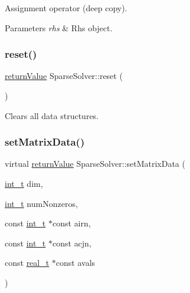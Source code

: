 Assignment operator (deep copy). 
\begin{DoxyParams}{Parameters}
{\em rhs} & Rhs object. \\
\hline
\end{DoxyParams}
\mbox{\label{class_sparse_solver_a917d966b021d7d116780d3cec3a196d8}} 
\subsubsection{\texorpdfstring{reset()}{reset()}}
{\footnotesize\ttfamily \hyperlink{_message_handling_8hpp_a81d556f613bfbabd0b1f9488c0fa865e}{return\+Value} Sparse\+Solver\+::reset (\begin{DoxyParamCaption}{ }\end{DoxyParamCaption})\hspace{0.3cm}{\ttfamily [virtual]}}

Clears all data structures. \mbox{\label{class_sparse_solver_a875146c92fbf3ea67cfc17233ba391e9}} 
\subsubsection{\texorpdfstring{set\+Matrix\+Data()}{setMatrixData()}}
{\footnotesize\ttfamily virtual \hyperlink{_message_handling_8hpp_a81d556f613bfbabd0b1f9488c0fa865e}{return\+Value} Sparse\+Solver\+::set\+Matrix\+Data (\begin{DoxyParamCaption}\item[{\hyperlink{_types_8hpp_ab6fd6105e64ed14a0c9281326f05e623}{int\+\_\+t}}]{dim,  }\item[{\hyperlink{_types_8hpp_ab6fd6105e64ed14a0c9281326f05e623}{int\+\_\+t}}]{num\+Nonzeros,  }\item[{const \hyperlink{_types_8hpp_ab6fd6105e64ed14a0c9281326f05e623}{int\+\_\+t} $\ast$const}]{airn,  }\item[{const \hyperlink{_types_8hpp_ab6fd6105e64ed14a0c9281326f05e623}{int\+\_\+t} $\ast$const}]{acjn,  }\item[{const \hyperlink{qp_o_a_s_e_s__wrapper_8h_a0d00e2b3dfadee81331bbb39068570c4}{real\+\_\+t} $\ast$const}]{avals }\end{DoxyParamCaption})\hspace{0.3cm}{\ttfamily [pure virtual]}}

